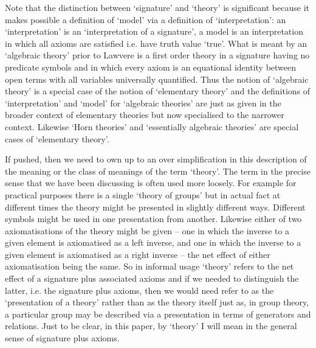 \note
Note that the distinction between `signature' and `theory' is significant because it makes possible a definition of `model' 
via a definition of `interpretation': an `interpretation' is an `interpretation of a signature', 
a model is an interpretation in which all axioms are satisfied i.e. have truth value `true'.   
\note
What is meant by an `algebraic theory' prior to Lawvere is a first order theory in a signature having no predicate symbols and in which every axiom is an equational identity between open terms with all variables universally quantified. Thus the notion of `algebraic theory' is  
 a special case of the notion of `elementary theory' and the 
definitions of `interpretation' and `model' for `algebraic theories' are just as given in the broader context of elementary theories but now specialised to the narrower context. Likewise  `Horn theories' and `essentially algebraic theories' are special cases of `elementary theory'. 

\note If pushed, then we need to own up to an  over simplification in this description of the meaning or the class of meanings of the term `theory'.
The term in the precise sense that we have been discussing is often used more loosely. For example for practical purposes there is a single `theory of groups'  but in actual fact at different times the theory might be presented in slightly different ways. Different symbols might be used in one presentation from another. Likewise either of two axiomatisations of the theory might be given -- one in which the inverse to a given element is axiomatised as a left inverse, and one in which the inverse to a given element is axiomatised as a right inverse -- the net effect of either axiomatisation being the same.
So in informal usage `theory' refers to the net effect of a signature plus associated axioms  and if we needed to distinguish the latter, i.e. the signature plus axioms, then we would need refer to as the `presentation of a theory' rather than as the theory itself just as, in group theory, a particular group may be described via a presentation in terms of generators and relations.  Just to be clear, in this paper, by `theory' I will mean in the general sense of signature plus axioms. 

